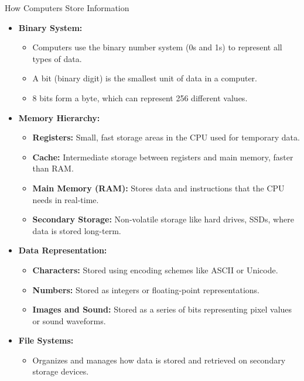 \documentclass[aspectratio=169]{beamer}
\begin{document}
\begin{frame}{How Computers Store Information}
    \begin{itemize}
        \item \textbf{Binary System:}
        \begin{itemize}
            \item Computers use the binary number system (0s and 1s) to represent all types of data.
            \item A bit (binary digit) is the smallest unit of data in a computer.
            \item 8 bits form a byte, which can represent 256 different values.
        \end{itemize}
        
        \item \textbf{Memory Hierarchy:}
        \begin{itemize}
            \item \textbf{Registers:} Small, fast storage areas in the CPU used for temporary data.
            \item \textbf{Cache:} Intermediate storage between registers and main memory, faster than RAM.
            \item \textbf{Main Memory (RAM):} Stores data and instructions that the CPU needs in real-time.
            \item \textbf{Secondary Storage:} Non-volatile storage like hard drives, SSDs, where data is stored long-term.
        \end{itemize}
        
        \item \textbf{Data Representation:}
        \begin{itemize}
            \item \textbf{Characters:} Stored using encoding schemes like ASCII or Unicode.
            \item \textbf{Numbers:} Stored as integers or floating-point representations.
            \item \textbf{Images and Sound:} Stored as a series of bits representing pixel values or sound waveforms.
        \end{itemize}
        
        \item \textbf{File Systems:}
        \begin{itemize}
            \item Organizes and manages how data is stored and retrieved on secondary storage devices.
        \end{itemize}
    \end{itemize}
\end{frame}
\end{document}

